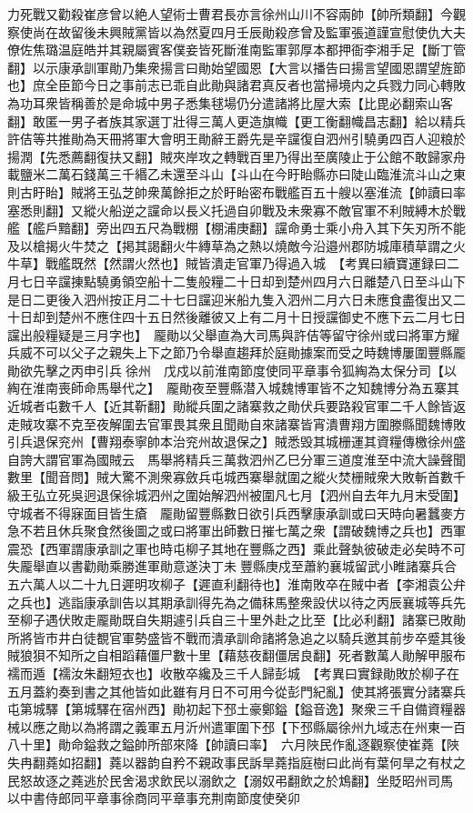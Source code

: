 力死戰又勸殺崔彦曾以絶人望術士曹君長亦言徐州山川不容兩帥【帥所類翻】今觀察使尚在故留後未興賊黨皆以為然夏四月壬辰勛殺彦曾及監軍張道謹宣慰使仇大夫僚佐焦璐温庭皓并其親屬賓客僕妾皆死斷淮南監軍郭厚本都押衙李湘手足【斷丁管翻】以示康承訓軍勛乃集衆揚言曰勛始望國恩【大言以播告曰揚言望國恩謂望旌節也】庶全臣節今日之事前志已乖自此勛與諸君真反者也當掃境内之兵戮力同心轉敗為功耳衆皆稱善於是命城中男子悉集毬場仍分遣諸將比屋大索【比毘必翻索山客翻】敢匿一男子者族其家選丁壯得三萬人更造旗幟【更工衡翻幟昌志翻】給以精兵許佶等共推勛為天冊將軍大會明王勛辭王爵先是辛讜復自泗州引驍勇四百人迎粮於揚潤【先悉薦翻復扶又翻】賊夾岸攻之轉戰百里乃得出至廣陵止于公館不敢歸家舟載鹽米二萬石錢萬三千緡乙未還至斗山【斗山在今盱眙縣亦曰陡山臨淮流斗山之東則古盱眙】賊將王弘芝帥衆萬餘拒之於盱眙密布戰艦百五十艘以塞淮流【帥讀曰率塞悉則翻】又縱火船逆之讜命以長义托過自卯戰及未衆寡不敵官軍不利賊縛木於戰艦【艦戶黯翻】旁出四五尺為戰棚【棚浦庚翻】讜命勇士乘小舟入其下矢刃所不能及以槍揭火牛焚之【掲其謁翻火牛縳草為之熱以燒敵今沿邉州郡防城庫積草謂之火牛草】戰艦既然【然謂火然也】賊皆潰走官軍乃得過入城　【考異曰續寶運録曰二月七日辛讜㨂點驍勇領空船十二隻般糧二十日却到楚州四月六日離楚八日至斗山下是日二更後入泗州按正月二十七日讜迎米船九隻入泗州二月六日未應食盡復出又二十日却到楚州不應住四十五日然後離彼又上有二月十日授讜御史不應下云二月七日讜出般糧疑是三月字也】　龎勛以父舉直為大司馬與許佶等留守徐州或曰將軍方耀兵威不可以父子之親失上下之節乃令舉直趨拜於庭勛據案而受之時魏博屢圍豐縣龎勛欲先擊之丙申引兵徐州　戊戍以前淮南節度使同平章事令狐綯為太保分司【以綯在淮南喪師命馬舉代之】　龎勛夜至豐縣潜入城魏博軍皆不之知魏博分為五寨其近城者屯數千人【近其靳翻】勛縱兵圍之諸寨救之勛伏兵要路殺官軍二千人餘皆返走賊攻寨不克至夜解圍去官軍畏其衆且聞勛自來諸寨皆宵潰曹翔方圍滕縣聞魏博敗引兵退保兖州【曹翔泰寧帥本治兖州故退保之】賊悉毁其城栅運其資糧傳檄徐州盛自誇大謂官軍為國賊云　馬舉將精兵三萬救泗州乙巳分軍三道度淮至中流大譟聲聞數里【聞音問】賊大驚不測衆寡斂兵屯城西寨舉就圍之縱火焚栅賊衆大敗斬首數千級王弘立死吳迥退保徐城泗州之圍始解泗州被圍凡七月【泗州自去年九月末受圍】守城者不得寐面目皆生瘡　龎勛留豐縣數日欲引兵西擊康承訓或曰天時向暑蠶麥方急不若且休兵聚食然後圖之或曰將軍出師數日摧七萬之衆【謂破魏博之兵也】西軍震恐【西軍謂康承訓之軍也時屯柳子其地在豐縣之西】乘此聲埶彼破走必矣時不可失龎舉直以書勸勛乘勝進軍勛意遂決丁未豐縣庚戍至蕭約襄城留武小睢諸寨兵合五六萬人以二十九日遲明攻柳子【遲直利翻待也】淮南敗卒在賊中者【李湘袁公弁之兵也】逃詣康承訓告以其期承訓得先為之備秣馬整衆設伏以待之丙辰襄城等兵先至柳子遇伏敗走龎勛既自失期遽引兵自三十里外赴之比至【比必利翻】諸寨已敗勛所將皆市井白徒覩官軍勢盛皆不戰而潰承訓命諸將急追之以騎兵邀其前步卒蹙其後賊狼狽不知所之自相蹈藉僵尸數十里【藉慈夜翻僵居良翻】死者數萬人勛解甲服布襦而遁【襦汝朱翻短衣也】收散卒纔及三千人歸彭城　【考異曰實録勛敗於柳子在五月蓋約奏到書之其他皆如此雖有月日不可用今從彭門紀亂】使其將張實分諸寨兵屯第城驛【第城驛在宿州西】勛初起下邳土豪鄭鎰【鎰音逸】聚衆三千自備資糧器械以應之勛以為將謂之義軍五月沂州遣軍圍下邳【下邳縣屬徐州九域志在州東一百八十里】勛命鎰救之鎰帥所部來降【帥讀曰率】　六月陜民作亂逐觀察使崔蕘【陜失冉翻蕘如招翻】蕘以器韵自矜不親政事民訴旱蕘指庭樹曰此尚有葉何旱之有杖之民怒故逐之蕘逃於民舍渴求飲民以溺飲之【溺奴弔翻飲之於鴆翻】坐貶昭州司馬　以中書侍郎同平章事徐商同平章事充荆南節度使癸卯